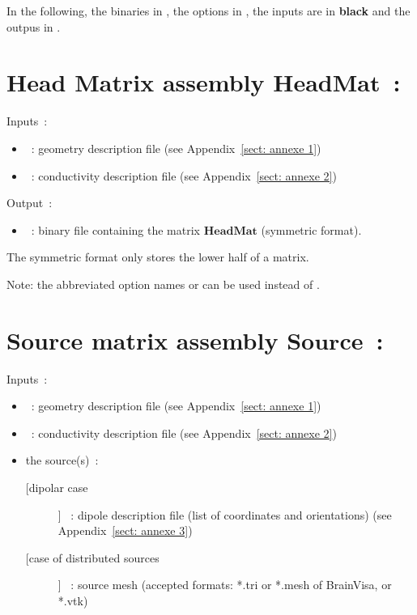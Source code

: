 \noindent
In the following, the binaries in , the options in , the inputs are in  \textbf{black} and the outpus in  . 

\section{Head Matrix assembly $\mathbf{HeadMat}$~:}
\label{sect: command assemble HeadMat}

\noindent
Inputs~: 
\begin{itemize}
    \item {}~: geometry description file (see Appendix~\ref{sect: annexe 1})
    \item {}~: conductivity description file (see Appendix~\ref{sect: annexe 2})
\end{itemize}

\noindent
Output~:
\begin{itemize}
    \item {}~: binary file containing the matrix $\mathbf{HeadMat}$ (symmetric format).
\end{itemize}
The symmetric format only stores the lower half of a matrix.
\medskip

\noindent
{}
\medskip
Note: the abbreviated option names  or  can be used instead of .

\section{Source matrix assembly $\mathbf{Source}$~:}
\label{sect: command assemble SourceMat}

\noindent
Inputs~: 
\begin{itemize}
    \item {}~: geometry description file (see Appendix~\ref{sect: annexe 1})
    \item {}~: conductivity description file (see Appendix~\ref{sect: annexe 2})
    \item the source(s)~:
        \begin{description}
            \item [[dipolar case]] ~: dipole description file (list of coordinates and orientations)
                                    (see Appendix~\ref{sect: annexe 3}) 
            \item [[case of distributed sources]]  ~: source mesh (accepted formats:  *.tri or *.mesh of BrainVisa, or *.vtk) 
        \end{description}
\end{itemize}

